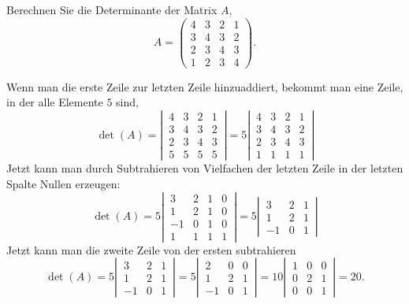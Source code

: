 Berechnen Sie die Determinante der Matrix $A$,
\[
A=\begin{pmatrix}
4&3&2&1\\
3&4&3&2\\
2&3&4&3\\
1&2&3&4
\end{pmatrix}.
\]

\begin{loesung}
Wenn man die erste Zeile zur letzten Zeile hinzuaddiert, bekommt man eine
Zeile, in der alle Elemente $5$ sind, 
\[
\det(A)
=
\left|\,
\begin{matrix}
 4& 3& 2& 1\\
 3& 4& 3& 2\\
 2& 3& 4& 3\\
 5& 5& 5& 5
\end{matrix}
\,\right|
=5
\left|\,
\begin{matrix}
4&3&2&1\\
3&4&3&2\\
2&3&4&3\\
1&1&1&1
\end{matrix}
\,\right|
\]
Jetzt kann man durch Subtrahieren von Vielfachen der letzten Zeile in
der letzten Spalte Nullen erzeugen:
\[
\det(A)
=
5
\left|\,
\begin{matrix}
 3&2&1&0\\
 1&2&1&0\\
-1&0&1&0\\
 1&1&1&1
\end{matrix}
\,\right|
=
5
\left|\,
\begin{matrix}
 3&2&1\\
 1&2&1\\
-1&0&1
\end{matrix}
\,\right|
\]
Jetzt kann man die zweite Zeile von der ersten subtrahieren
\[
\det(A)
=
5
\left|\,
\begin{matrix}
 3&2&1\\
 1&2&1\\
-1&0&1
\end{matrix}
\,\right|
=
5
\left|\,
\begin{matrix}
 2&0&0\\
 1&2&1\\
-1&0&1
\end{matrix}
\,\right|
=
10
\left|\,
\begin{matrix}
1&0&0\\
0&2&1\\
0&0&1
\end{matrix}
\,\right|
=20.
\]


\end{loesung}
